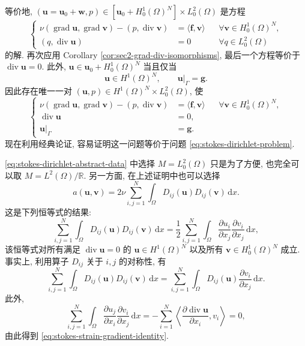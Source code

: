 \begin{Proof}
等价地,
$(\mathbf{u}=\mathbf{u}_0+\mathbf{w},p)
\in[\mathbf{u}_0+H_0^1(\Omega)^N]\times L_0^2(\Omega)$
是方程
\[
\left\{
\begin{aligned}
\nu(\operatorname{grad}\mathbf{u},
\operatorname{grad}\mathbf{v})
-(p,\operatorname{div}\mathbf{v})
&=\langle\mathbf{f},\mathbf{v}\rangle
&&\forall\mathbf{v}\in H_0^1(\Omega)^N,\\
(q,\operatorname{div}\mathbf{u})&=0
&&\forall q\in L_0^2(\Omega)
\end{aligned}
\right.
\]
的解. 再次应用 Corollary
\ref{cor:sec2-grad-div-isomorphisms}, 最后一个方程等价于
$\operatorname{div}\mathbf{u}=0$. 此外,
$\mathbf{u}\in\mathbf{u}_0+H_0^1(\Omega)^N$ 当且仅当
\[
\mathbf{u}\in H^1(\Omega)^N,
\qquad
\mathbf{u}|_\Gamma=\mathbf{g}.
\]
因此存在唯一一对
$(\mathbf{u},p)\in H^1(\Omega)^N\times L_0^2(\Omega)$, 使
\[
\left\{
\begin{aligned}
\nu(\operatorname{grad}\mathbf{u},
\operatorname{grad}\mathbf{v})
-(p,\operatorname{div}\mathbf{v})
&=\langle\mathbf{f},\mathbf{v}\rangle
&&\forall\mathbf{v}\in H_0^1(\Omega)^N,\\
\operatorname{div}\mathbf{u}&=0,\\
\mathbf{u}|_\Gamma&=\mathbf{g}.
\end{aligned}
\right.
\]
现在利用经典论证, 容易证明这一问题等价于问题
\eqref{eq:stokes-dirichlet-problem}.
\end{Proof}

\setcounter{statement}{0}
\begin{Remark}\label{rem:stokes-pressure-quotient-space}
\eqref{eq:stokes-dirichlet-abstract-data} 中选择
$M=L_0^2(\Omega)$ 只是为了方便, 也完全可以取
$M=L^2(\Omega)/\mathbb{R}$. 另一方面, 在上述证明中也可以选择
\[
a(\mathbf{u},\mathbf{v})
=2\nu\sum_{i,j=1}^{N}
\int_\Omega D_{ij}(\mathbf{u})
D_{ij}(\mathbf{v})\,\mathrm{d}x.
\]
这是下列恒等式的结果:
\begin{equation}\label{eq:stokes-strain-gradient-identity}
\sum_{i,j=1}^{N}
\int_\Omega D_{ij}(\mathbf{u})
D_{ij}(\mathbf{v})\,\mathrm{d}x
=\frac12\sum_{i,j=1}^{N}
\int_\Omega
\frac{\partial u_i}{\partial x_j}
\frac{\partial v_i}{\partial x_j}\,\mathrm{d}x,
\end{equation}
该恒等式对所有满足
$\operatorname{div}\mathbf{u}=0$ 的
$\mathbf{u}\in H^1(\Omega)^N$ 以及所有
$\mathbf{v}\in H_0^1(\Omega)^N$ 成立. 事实上, 利用算子
$D_{ij}$ 关于 $i,j$ 的对称性, 有
\[
\sum_{i,j=1}^{N}\int_\Omega
D_{ij}(\mathbf{u})D_{ij}(\mathbf{v})\,\mathrm{d}x
=\sum_{i,j=1}^{N}\int_\Omega
D_{ij}(\mathbf{u})
\frac{\partial v_i}{\partial x_j}\,\mathrm{d}x.
\]
此外,
\[
\sum_{i,j=1}^{N}\int_\Omega
\frac{\partial u_j}{\partial x_i}
\frac{\partial v_i}{\partial x_j}\,\mathrm{d}x
=-\sum_{i=1}^{N}
\left\langle
\frac{\partial\operatorname{div}\mathbf{u}}{\partial x_i},
v_i
\right\rangle
=0,
\]
由此得到 \eqref{eq:stokes-strain-gradient-identity}.
\end{Remark}
